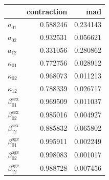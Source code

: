 \begin{tabular}{lrr}
\toprule
 & contraction & mad \\
\midrule
$a_{01}$ & 0.588246 & 0.234143 \\
$a_{02}$ & 0.932531 & 0.056621 \\
$a_{12}$ & 0.331056 & 0.280862 \\
$\kappa_{01}$ & 0.772756 & 0.028912 \\
$\kappa_{02}$ & 0.968073 & 0.011213 \\
$\kappa_{12}$ & 0.788339 & 0.026717 \\
$\beta_{01}^\text{sex}$ & 0.969509 & 0.011037 \\
$\beta_{02}^\text{sex}$ & 0.985016 & 0.004927 \\
$\beta_{12}^\text{sex}$ & 0.885832 & 0.065802 \\
$\beta_{01}^\text{age}$ & 0.995911 & 0.002249 \\
$\beta_{02}^\text{age}$ & 0.998083 & 0.001017 \\
$\beta_{12}^\text{age}$ & 0.988728 & 0.007456 \\
\bottomrule
\end{tabular}
